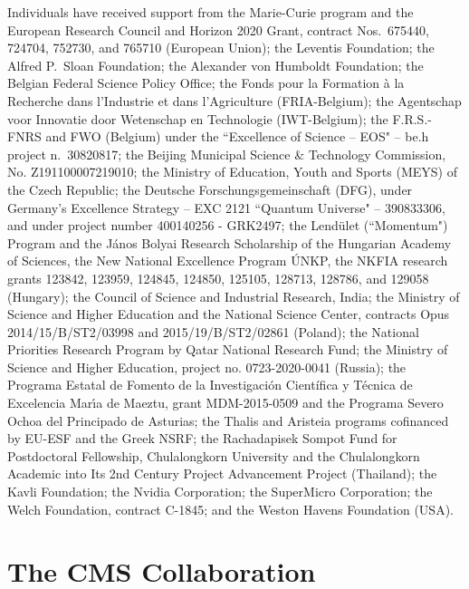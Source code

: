\documentclass[11pt,twoside,a4paper,cmspaper,final,collab]{cms-tdr}
\begin{document}
\begin{acknowledgments}
   Individuals have received support from the Marie-Curie program and the European Research Council and Horizon 2020 Grant, contract Nos.\ 675440, 724704, 752730, and 765710 (European Union); the Leventis Foundation; the Alfred P.\ Sloan Foundation; the Alexander von Humboldt Foundation; the Belgian Federal Science Policy Office; the Fonds pour la Formation \`a la Recherche dans l'Industrie et dans l'Agriculture (FRIA-Belgium); the Agentschap voor Innovatie door Wetenschap en Technologie (IWT-Belgium); the F.R.S.-FNRS and FWO (Belgium) under the ``Excellence of Science -- EOS" -- be.h project n.\ 30820817; the Beijing Municipal Science \& Technology Commission, No. Z191100007219010; the Ministry of Education, Youth and Sports (MEYS) of the Czech Republic; the Deutsche Forschungsgemeinschaft (DFG), under Germany's Excellence Strategy -- EXC 2121 ``Quantum Universe" -- 390833306, and under project number 400140256 - GRK2497; the Lend\"ulet (``Momentum") Program and the J\'anos Bolyai Research Scholarship of the Hungarian Academy of Sciences, the New National Excellence Program \'UNKP, the NKFIA research grants 123842, 123959, 124845, 124850, 125105, 128713, 128786, and 129058 (Hungary); the Council of Science and Industrial Research, India; the Ministry of Science and Higher Education and the National Science Center, contracts Opus 2014/15/B/ST2/03998 and 2015/19/B/ST2/02861 (Poland); the National Priorities Research Program by Qatar National Research Fund; the Ministry of Science and Higher Education, project no. 0723-2020-0041 (Russia); the Programa Estatal de Fomento de la Investigaci{\'o}n Cient{\'i}fica y T{\'e}cnica de Excelencia Mar\'{\i}a de Maeztu, grant MDM-2015-0509 and the Programa Severo Ochoa del Principado de Asturias; the Thalis and Aristeia programs cofinanced by EU-ESF and the Greek NSRF; the Rachadapisek Sompot Fund for Postdoctoral Fellowship, Chulalongkorn University and the Chulalongkorn Academic into Its 2nd Century Project Advancement Project (Thailand); the Kavli Foundation; the Nvidia Corporation; the SuperMicro Corporation; the Welch Foundation, contract C-1845; and the Weston Havens Foundation (USA).\end{acknowledgments}



\cleardoublepage \appendix\section{The CMS Collaboration \label{app:collab}}\begin{sloppypar}\end{sloppypar}
\end{document}
